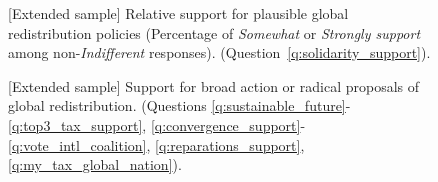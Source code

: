 \begin{figure}[h!]
\begin{subfigure}{.49\textwidth}
\end{subfigure}
\end{figure}

\begin{figure}[h!]
    \caption[{[}Extended sample{]} Relative support for plausible global policies]{[Extended sample] Relative support for plausible global redistribution policies (Percentage of \textit{Somewhat} or \textit{Strongly support} among non-\textit{Indifferent} responses). (Question~\ref{q:solidarity_support}).
    }\label{fig:solidarity_support_share_extended}
\end{figure}
\begin{figure}[h!]
    \caption[{[}Extended sample{]} Support for broad or radical global redistribution]{[Extended sample] Support for broad action or radical proposals of global redistribution. \hfill (Questions \ref{q:sustainable_future}-\ref{q:top3_tax_support}, \ref{q:convergence_support}-\ref{q:vote_intl_coalition}, \ref{q:reparations_support}, \ref{q:my_tax_global_nation}).
    }\label{fig:radical_redistr_share_extended} 
\end{figure}

